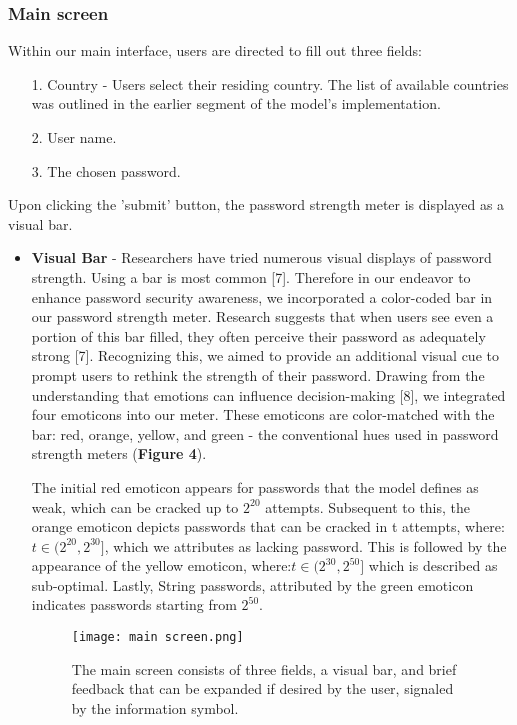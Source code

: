 \documentclass[5p,twocolumn]{elsarticle}
\begin{document}
\subsubsection{\textbf{Main screen}}
Within our main interface, users are directed to fill out three fields:
\begin{enumerate}
\item[1.] 
Country - Users select their residing country. The list of available countries was outlined in the earlier segment of the model's implementation.
\item[2.] 
User name.
\item[3.] 
The chosen password.
\end{enumerate}
Upon clicking the 'submit' button, the password strength meter is displayed as a visual bar.
\begin{itemize}
    \item \textbf{Visual Bar} - Researchers have tried numerous visual displays of password strength. Using a bar is most common [7]. Therefore in our endeavor to enhance password security awareness, we incorporated a color-coded bar in our password strength meter. Research suggests that when users see even a portion of this bar filled, they often perceive their password as adequately strong [7]. Recognizing this, we aimed to provide an additional visual cue to prompt users to rethink the strength of their password. Drawing from the understanding that emotions can influence decision-making [8], we integrated four emoticons into our meter. These emoticons are color-matched with the bar: red, orange, yellow, and green - the conventional hues used in password strength meters (\textbf{Figure 4}).
    
    The initial red emoticon appears for passwords that the model defines as weak, which can be cracked up to \(2^{20}\)  attempts. Subsequent to this, the orange emoticon depicts passwords that can be cracked in t attempts, where: \(t \in (2^{20}, 2^{30}]\), which we attributes as lacking password. This is followed by the appearance of the yellow emoticon, where:\(t \in (2^{30}, 2^{50}]\) which is described as sub-optimal. Lastly, String passwords, attributed by the green emoticon indicates passwords starting from \(2^{50} \).
    
\begin{figure}[h]
\centering 
\texttt{[image: main screen.png]}
\caption{The main screen consists of three fields, a visual bar, and brief feedback that can be expanded if desired by the user, signaled by the information symbol.}
\label{fig_mom0}%
\end{figure}


\end{itemize}
\end{document}
